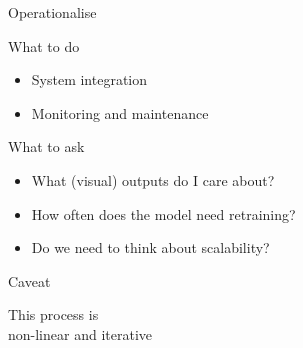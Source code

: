 \begin{frame}[t]{Operationalise}
    \begin{block}{What to do}
        \begin{itemize}
            \item System integration
            \item Monitoring and maintenance
        \end{itemize}
    \end{block}
    \vfill\pause
    \begin{block}{What to ask}
        \begin{itemize}
            \item What (visual) outputs do I care about?
            \item How often does the model need retraining?
            \item Do we need to think about scalability?
        \end{itemize}
    \end{block}
\end{frame}

\begin{frame}{Caveat}
    \begin{center}
        \Large%
        This process is \\
        non\hyp{}linear and iterative
    \end{center}
\end{frame}



